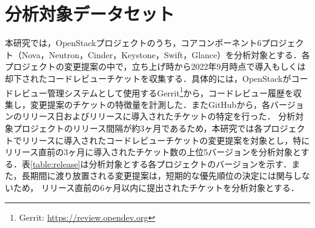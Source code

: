 \documentclass[T,J]{fose} %
\newcommand{\todo}[1]{\colorbox{yellow}{{\bf TODO}:}{\color{red} {\textbf{[#1]}}}}
\newcommand{\change}[1]{\colorbox{green}{{\bf CHANGE}:}{\color{black} {\textbf{[#1]}}}}
\begin{document}
\section{分析対象データセット}\label{sec:dataset}
本研究では，OpenStackプロジェクトのうち，コアコンポーネント6プロジェクト（Nova，Neutron，Cinder，Keystone，Swift，Glance）を分析対象とする．各プロジェクトの変更提案の中で，立ち上げ時から2022年9月時点で導入もしくは却下されたコードレビューチケットを収集する．具体的には，OpenStackがコードレビュー管理システムとして使用するGerrit\footnote{Gerrit: \url{https://review.opendev.org}}から，コードレビュー履歴を収集し，変更提案のチケットの特徴量を計測した．またGitHubから，各バージョンのリリース日およびリリースに導入されたチケットの特定を行った．
分析対象プロジェクトのリリース間隔が約3ヶ月であるため，本研究では各プロジェクトでリリースに導入されたコードレビューチケットの変更提案を対象とし，特にリリース直前の3ヶ月に導入されたチケット数の上位5バージョンを分析対象とする．表\ref{table:release}は分析対象とする各プロジェクトのバージョンを示す．また，長期間に渡り放置される変更提案は，短期的な優先順位の決定には関与しないため，
リリース直前の6ヶ月以内に提出されたチケットを分析対象とする．


\end{document}
